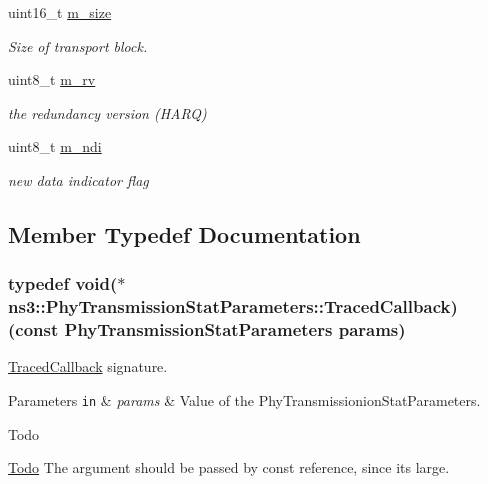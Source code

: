\begin{DoxyCompactItemize}
uint16\+\_\+t \hyperlink{structns3_1_1PhyTransmissionStatParameters_a4e06467cd57d7d635eb113c29de58f81}{m\+\_\+size}
\begin{DoxyCompactList}\small\item\em Size of transport block. \end{DoxyCompactList}\item 
uint8\+\_\+t \hyperlink{structns3_1_1PhyTransmissionStatParameters_a9a7300c9449e5a39a493c0bdd00add10}{m\+\_\+rv}
\begin{DoxyCompactList}\small\item\em the redundancy version (H\+A\+RQ) \end{DoxyCompactList}\item 
uint8\+\_\+t \hyperlink{structns3_1_1PhyTransmissionStatParameters_a10c7161e27960de7d057b991d953f3f1}{m\+\_\+ndi}
\begin{DoxyCompactList}\small\item\em new data indicator flag \end{DoxyCompactList}\end{DoxyCompactItemize}


\subsection{Member Typedef Documentation}
\subsubsection[{\texorpdfstring{Traced\+Callback}{TracedCallback}}]{\setlength{\rightskip}{0pt plus 5cm}typedef void($\ast$  ns3\+::\+Phy\+Transmission\+Stat\+Parameters\+::\+Traced\+Callback) (const {\bf Phy\+Transmission\+Stat\+Parameters} params)}\hypertarget{structns3_1_1PhyTransmissionStatParameters_aebba0b6c1acfc474d50de729df924183}{}\label{structns3_1_1PhyTransmissionStatParameters_aebba0b6c1acfc474d50de729df924183}
\hyperlink{classns3_1_1TracedCallback}{Traced\+Callback} signature.


\begin{DoxyParams}[1]{Parameters}
\mbox{\tt in}  & {\em params} & Value of the Phy\+Transmissionion\+Stat\+Parameters. \\
\hline
\end{DoxyParams}
\begin{DoxyRefDesc}{Todo}
\item[\hyperlink{todo__todo000082}{Todo}]The argument should be passed by const reference, since it\textquotesingle{}s large. \end{DoxyRefDesc}


